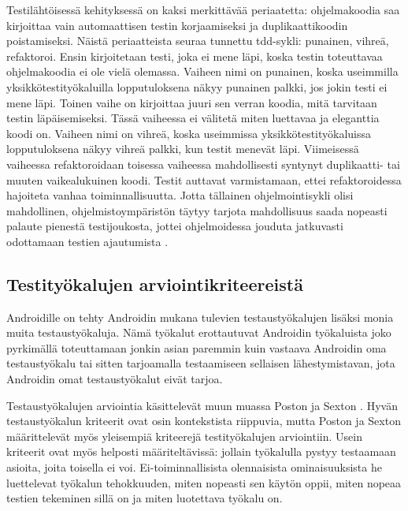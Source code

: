 Testilähtöisessä kehityksessä on kaksi merkittävää periaatetta: ohjelmakoodia saa kirjoittaa vain automaattisen testin korjaamiseksi ja duplikaattikoodin poistamiseksi. Näistä periaatteista seuraa tunnettu tdd-sykli: punainen, vihreä, refaktoroi. Ensin kirjoitetaan testi, joka ei mene läpi, koska testin toteuttavaa ohjelmakoodia ei ole vielä olemassa. Vaiheen nimi on punainen, koska useimmilla yksikkötestityökaluilla lopputuloksena näkyy punainen palkki, jos jokin testi ei mene läpi. Toinen vaihe on kirjoittaa juuri sen verran koodia, mitä tarvitaan testin läpäisemiseksi. Tässä vaiheessa ei välitetä miten luettavaa ja eleganttia koodi on. Vaiheen nimi on vihreä, koska useimmissa yksikkötestityökaluissa lopputuloksena näkyy vihreä palkki, kun testit menevät läpi. Viimeisessä vaiheessa refaktoroidaan toisessa vaiheessa mahdollisesti syntynyt duplikaatti- tai muuten vaikealukuinen koodi. Testit auttavat varmistamaan, ettei refaktoroidessa hajoiteta vanhaa toiminnallisuutta. Jotta tällainen ohjelmointisykli olisi mahdollinen, ohjelmistoympäristön täytyy tarjota mahdollisuus saada nopeasti palaute pienestä testijoukosta, jottei ohjelmoidessa jouduta jatkuvasti odottamaan testien ajautumista \cite{tdd}.

\subsection{Testityökalujen arviointikriteereistä}
\label{test_criteria}

Androidille on tehty Androidin mukana tulevien testaustyökalujen lisäksi monia muita testaustyökaluja. Nämä työkalut erottautuvat Androidin työkaluista joko pyrkimällä toteuttamaan jonkin asian paremmin kuin vastaava Androidin oma testaustyökalu tai sitten tarjoamalla testaamiseen sellaisen lähestymistavan, jota Androidin omat testaustyökalut eivät tarjoa.

Testaustyökalujen arviointia käsittelevät muun muassa Poston ja Sexton \cite{poston92}. Hyvän testaustyökalun kriteerit ovat osin kontekstista riippuvia, mutta Poston ja Sexton määrittelevät myös yleisempiä kriteerejä testityökalujen arviointiin. Usein kriteerit ovat myös helposti määriteltävissä: jollain työkalulla pystyy testaamaan asioita, joita toisella ei voi. Ei-toiminnallisista olennaisista ominaisuuksista he luettelevat työkalun tehokkuuden, miten nopeasti sen käytön oppii, miten nopeaa testien tekeminen sillä on ja miten luotettava työkalu on.

